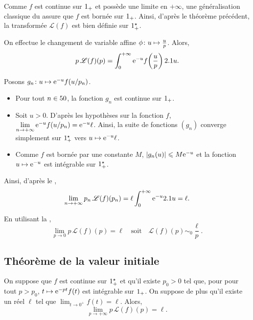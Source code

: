 \begin{solution}
\begin{reponses}
\item Comme $f$ est continue sur $\Rp$ et possède une limite en $+\infty$, une généralisation classique du  assure que $f$ est bornée sur $\Rp$. Ainsi, d'après le théorème précédent, la transformée $\mathscr{L}(f)$ est bien définie sur $\Rpe$.

\item On effectue le changement de variable affine $\fonctionligne[\phi]{u}{\frac{u}{p}}$. Alors,
\[
p\, \mathscr{L}(f)(p) = \int_0^{+\infty} \e^{-u} f\mathopen{}\left(\frac{u}{p}\right) \d u.
\]

\item Posons $\fonctionligne[g_n]{u}{\e^{-u} f(u/p_n)}$.
\begin{itemize}
\item Pour tout $n \in \N$, la fonction $g_n$ est continue sur $\Rp$.

\item Soit $u > 0$. D'après les hypothèses sur la fonction $f$, $\lim\limits_{n\to+\infty} \e^{-u} f(u/p_n) = \e^{-u} \ell$. Ainsi, la suite de fonctions $(g_n)$ converge simplement sur $\Rpe$ vers $u \mapsto \e^{-u} \ell$.

\item Comme $f$ est bornée par une constante $M$, $\abs{g_n(u)} \leqslant M \e^{-u}$ et la fonction $u \mapsto \e^{-u}$ est intégrable sur $\Rpe$.
\end{itemize}
Ainsi, d'après le ,
\[
\lim_{n\to+\infty} p_n\, \mathscr{L}(f)(p_n) = \ell \int_0^{+\infty} \e^{-u} \d u = \ell.
\]

\item En utilisant la ,
\[
\lim_{p\to 0} p\, \mathscr{L}(f)(p) = \ell \quad \text{soit} \quad \mathscr{L}(f)(p) \sim_0 \frac{\ell}{p}.
\]
\end{reponses}
\end{solution}

\subsection{Théorème de la valeur initiale}

\begin{theo}
On suppose que $f$ est continue sur $\Rpe$ et qu'il existe $p_0 > 0$ tel que, pour pour tout $p > p_0$, $t \mapsto \e^{-p t} f(t)$ est intégrable sur $\Rp$. On suppose de plus qu'il existe un réel $\ell$ tel que $\lim_{t\to0^+} f(t) = \ell$. Alors,
\[
\lim_{p\to+\infty} p\, \mathscr{L}(f)(p) = \ell.
\]
\end{theo}


